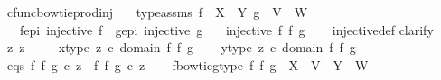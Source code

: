 \begin{isabellebody}
\isanewline
%
\endisadelimproof
\isanewline
{}\isamarkupfalse%
\ cfunc{\isacharunderscore}{\kern0pt}bowtieprod{\isacharunderscore}{\kern0pt}inj{\isacharcolon}{\kern0pt}\isanewline
\ \ \ type{\isacharunderscore}{\kern0pt}assms{\isacharcolon}{\kern0pt}\ {\isachardoublequoteopen}f\ {\isacharcolon}{\kern0pt}\ X\ {\isasymrightarrow}\ Y{\isachardoublequoteclose}\ {\isachardoublequoteopen}g\ {\isacharcolon}{\kern0pt}\ V\ {\isasymrightarrow}\ W{\isachardoublequoteclose}\isanewline
\ \ \ f{\isacharunderscore}{\kern0pt}epi{\isacharcolon}{\kern0pt}\ {\isachardoublequoteopen}injective\ f{\isachardoublequoteclose}\ \ g{\isacharunderscore}{\kern0pt}epi{\isacharcolon}{\kern0pt}\ {\isachardoublequoteopen}injective\ g{\isachardoublequoteclose}\isanewline
\ \ \ {\isachardoublequoteopen}injective\ {\isacharparenleft}{\kern0pt}f\ {\isasymbowtie}\isactrlsub f\ g{\isacharparenright}{\kern0pt}{\isachardoublequoteclose}\isanewline
%
\isadelimproof
\ \ %
\endisadelimproof
%
\isatagproof
{}\isamarkupfalse%
\ injective{\isacharunderscore}{\kern0pt}def\isanewline
{}\isamarkupfalse%
{\isacharparenleft}{\kern0pt}clarify{\isacharparenright}{\kern0pt}\isanewline
\ \ \isamarkupfalse%
\ z{}\ z{}\ \isanewline
\ \ \isamarkupfalse%
\ x{\isacharunderscore}{\kern0pt}type{\isacharcolon}{\kern0pt}\ {\isachardoublequoteopen}z{}\ {\isasymin}\isactrlsub c\ domain\ {\isacharparenleft}{\kern0pt}f\ {\isasymbowtie}\isactrlsub f\ g{\isacharparenright}{\kern0pt}{\isachardoublequoteclose}\isanewline
\ \ \isamarkupfalse%
\ y{\isacharunderscore}{\kern0pt}type{\isacharcolon}{\kern0pt}\ {\isachardoublequoteopen}z{}\ {\isasymin}\isactrlsub c\ domain\ {\isacharparenleft}{\kern0pt}f\ {\isasymbowtie}\isactrlsub f\ g{\isacharparenright}{\kern0pt}{\isachardoublequoteclose}\isanewline
\ \ \isamarkupfalse%
\ eqs{\isacharcolon}{\kern0pt}\ {\isachardoublequoteopen}{\isacharparenleft}{\kern0pt}f\ {\isasymbowtie}\isactrlsub f\ g{\isacharparenright}{\kern0pt}\ {\isasymcirc}\isactrlsub c\ z{}\ {\isacharequal}{\kern0pt}\ {\isacharparenleft}{\kern0pt}f\ {\isasymbowtie}\isactrlsub f\ g{\isacharparenright}{\kern0pt}\ {\isasymcirc}\isactrlsub c\ z{}{\isachardoublequoteclose}\isanewline
\isanewline
\ \ \isamarkupfalse%
\ f{\isacharunderscore}{\kern0pt}bowtie{\isacharunderscore}{\kern0pt}g{\isacharunderscore}{\kern0pt}type{\isacharcolon}{\kern0pt}\ {\isachardoublequoteopen}{\isacharparenleft}{\kern0pt}f\ {\isasymbowtie}\isactrlsub f\ g{\isacharparenright}{\kern0pt}\ {\isacharcolon}{\kern0pt}\ X\ {\isasymCoprod}\ V\ {\isasymrightarrow}\ Y\ {\isasymCoprod}\ W{\isachardoublequoteclose}\isanewline

\end{isabellebody}
